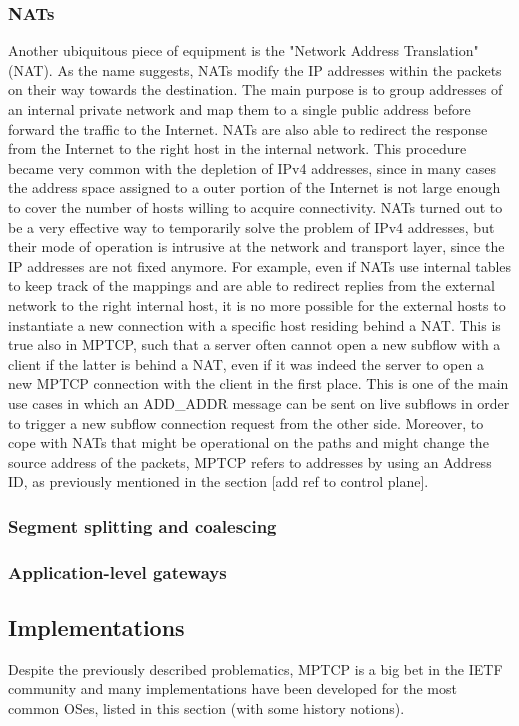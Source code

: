 \subsubsection{NATs}
Another ubiquitous piece of equipment is the "Network Address Translation" (NAT). As the name suggests, NATs modify the IP addresses within the packets on their way towards the destination. The main purpose is to group addresses of an internal private network and map them to a single public address before forward the traffic to the Internet. NATs are also able to redirect the response from the Internet to the right host in the internal network.
This procedure became very common with the depletion of IPv4 addresses, since in many cases the address space assigned to a outer portion of the Internet is not large enough to cover the number of hosts willing to acquire connectivity. 
NATs turned out to be a very effective way to temporarily solve the problem of IPv4 addresses, but their mode of operation is intrusive at the network and transport layer, since the IP addresses are not fixed anymore.
For example, even if NATs use internal tables to keep track of the mappings and are able to redirect replies from the external network to the right internal host, it is no more possible for the external hosts to instantiate a new connection with a specific host residing behind a NAT. This is true also in MPTCP, such that a server often cannot open a new subflow with a client if the latter is behind a NAT, even if it was indeed the server to open a new MPTCP connection with the client in the first place. This is one of the main use cases in which an ADD\_ADDR message can be sent on live subflows in order to trigger a new subflow connection request from the other side.
Moreover, to cope with NATs that might be operational on the paths and might change the source address of the packets, MPTCP refers to addresses by using an Address ID, as previously mentioned in the section [add ref to control plane]. 

\subsubsection{Segment splitting and coalescing}
\subsubsection{Application-level gateways}

\subsection{Implementations}
Despite the previously described problematics, MPTCP is a big bet in the IETF community and many implementations have been developed for the most common OSes, listed in this section (with some history notions).

